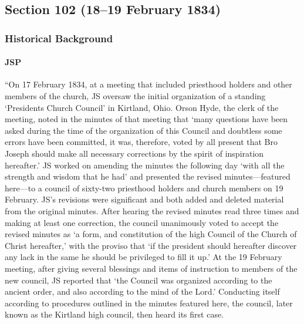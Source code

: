 \subsection{Section 102 (18--19 February 1834)}
	\label{DC102}
	
	\subsubsection{Historical Background}
		\label{DC102-HB}
		
		\paragraph{JSP}
		
			``On 17 February 1834, at a meeting that included priesthood holders and other members of the church, JS oversaw the initial organization of a standing `Presidents Church Council' in Kirtland, Ohio. Orson Hyde, the clerk of the meeting, noted in the minutes of that meeting that `many questions have been asked during the time of the organization of this Council and doubtless some errors have been committed, it was, therefore, voted by all present that Bro Joseph should make all necessary corrections by the spirit of inspiration hereafter.' JS worked on amending the minutes the following day `with all the strength and wisdom that he had' and presented the revised minutes---featured here---to a council of sixty-two priesthood holders and church members on 19 February. JS's revisions were significant and both added and deleted material from the original minutes. After hearing the revised minutes read three times and making at least one correction, the council unanimously voted to accept the revised minutes as `a form, and constitution of the high Council of the Church of Christ hereafter,' with the proviso that `if the president should hereafter discover any lack in the same he should be privileged to fill it up.' At the 19 February meeting, after giving several blessings and items of instruction to members of the new council, JS reported that `the Council was organized according to the ancient order, and also according to the mind of the Lord.' Conducting itself according to procedures outlined in the minutes featured here, the council, later known as the Kirtland high council, then heard its first case.
			
